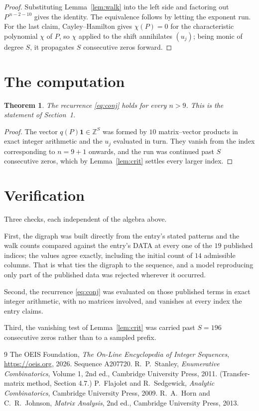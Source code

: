 \documentclass[11pt,a4paper]{article}
\theoremstyle{plain}
\newtheorem{theorem}{Theorem}
\theoremstyle{definition}
\begin{document}
\begin{proof}
Substituting Lemma~\ref{lem:walk} into the left side and factoring out
$P^{\,n-2-10}$ gives the identity. The equivalence follows by letting the exponent
run. For the last claim, Cayley--Hamilton gives $\chi(P)=0$ for the characteristic
polynomial $\chi$ of $P$, so $\chi$ applied to the shift annihilates $(u_j)$; being monic of
degree $S$, it propagates $S$ consecutive zeros forward.
\end{proof}

\section{The computation}

\begin{theorem}
The recurrence \eqref{eq:conj} holds for every $n>9$. This is the statement of
Section~1.
\end{theorem}

\begin{proof}
The vector $q(P)\mathbf{1}\in\mathbb{Z}^{S}$ was formed by $10$ matrix--vector
products in exact integer arithmetic and the $u_j$ evaluated in turn. They vanish from the
index corresponding to $n=9+1$ onwards, and the run was continued past $S$ consecutive
zeros, which by Lemma~\ref{lem:crit} settles every larger index.
\end{proof}

\section{Verification}

Three checks, each independent of the algebra above.

First, the digraph was built directly from the entry's stated patterns and the walk counts
compared against the entry's DATA at every one of the $19$ published indices; the
values agree exactly, including the initial count of $14$ admissible columns. That is
what ties the digraph to the sequence, and a model reproducing only part of the published
data was rejected wherever it occurred.

Second, the recurrence \eqref{eq:conj} was evaluated on those published terms in exact
integer arithmetic, with no matrices involved, and vanishes at every index the entry claims.

Third, the vanishing test of Lemma~\ref{lem:crit} was carried past $S=196$ consecutive
zeros rather than to a sampled prefix.

\begin{thebibliography}{9}
 The OEIS Foundation, \emph{The On-Line Encyclopedia of Integer
Sequences}, \url{https://oeis.org}, 2026. Sequence A207720.
 R.~P.~Stanley, \emph{Enumerative Combinatorics}, Volume 1, 2nd ed.,
Cambridge University Press, 2011. (Transfer-matrix method, Section 4.7.)
 P.~Flajolet and R.~Sedgewick, \emph{Analytic Combinatorics}, Cambridge
University Press, 2009.
 R.~A.~Horn and C.~R.~Johnson, \emph{Matrix Analysis}, 2nd ed., Cambridge
University Press, 2013.
\end{thebibliography}
\end{document}
